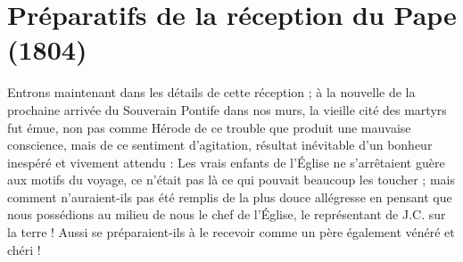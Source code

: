 \documentclass[11pt,a4paper]{report}
\begin{document}
\section*{Préparatifs de la réception du Pape (1804)}

Entrons maintenant dans les détails de cette réception ; à la nouvelle de la prochaine arrivée du Souverain Pontife dans nos murs, la vieille cité des martyrs fut émue, non pas comme Hérode de ce trouble que produit une mauvaise conscience, mais de ce sentiment d'agitation, résultat inévitable d'un bonheur inespéré et vivement attendu : Les vrais enfants de l'Église ne s'arrêtaient guère aux motifs du voyage, ce n'était pas là ce qui pouvait beaucoup les toucher ; mais comment n'auraient-ils pas été remplis de la plus douce allégresse en pensant que nous possédions au milieu de nous le chef de l'Église, le représentant de J.C. sur la terre ! Aussi se préparaient-ils à le recevoir comme un père également vénéré et chéri !
\end{document}
